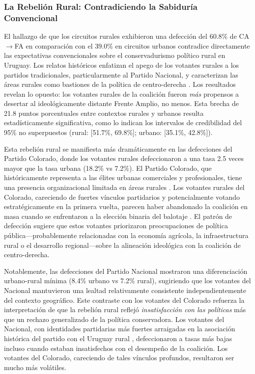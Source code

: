 \subsubsection{La Rebelión Rural: Contradiciendo la Sabiduría Convencional}

El hallazgo de que los circuitos rurales exhibieron una defección del 60.8\% de CA$\to$FA en comparación con el 39.0\% en circuitos urbanos contradice directamente las expectativas convencionales sobre el conservadurismo político rural en Uruguay. Los relatos históricos enfatizan el apego de los votantes rurales a los partidos tradicionales, particularmente al Partido Nacional, y caracterizan las áreas rurales como bastiones de la política de centro-derecha \citep{gonzalez1991electoral}. Los resultados revelan lo opuesto: los votantes rurales de la coalición fueron \textit{más} propensos a desertar al ideológicamente distante Frente Amplio, no menos. Esta brecha de 21.8 puntos porcentuales entre contextos rurales y urbanos resulta estadísticamente significativa, como lo indican los intervalos de credibilidad del 95\% no superpuestos (rural: [51.7\%, 69.8\%]; urbano: [35.1\%, 42.8\%]).

Esta rebelión rural se manifiesta más dramáticamente en las defecciones del Partido Colorado, donde los votantes rurales defeccionaron a una tasa 2.5 veces mayor que la tasa urbana (18.2\% vs 7.2\%). El Partido Colorado, que históricamente representa a las élites urbanas comerciales y profesionales, tiene una presencia organizacional limitada en áreas rurales \citep{buquet2015uruguayan, chasquetti2004democracia}. Los votantes rurales del Colorado, careciendo de fuertes vínculos partidarios y potencialmente votando estratégicamente en la primera vuelta, parecen haber abandonado la coalición en masa cuando se enfrentaron a la elección binaria del balotaje \citep{birch2003tworound}. El patrón de defección sugiere que estos votantes priorizaron preocupaciones de política pública---probablemente relacionadas con la economía agrícola, la infraestructura rural o el desarrollo regional---sobre la alineación ideológica con la coalición de centro-derecha.

Notablemente, las defecciones del Partido Nacional mostraron una diferenciación urbano-rural mínima (8.4\% urbano vs 7.2\% rural), sugiriendo que los votantes del Nacional mantuvieron una lealtad relativamente consistente independientemente del contexto geográfico. Este contraste con los votantes del Colorado refuerza la interpretación de que la rebelión rural reflejó \textit{insatisfacción con las políticas} más que un rechazo generalizado de la política conservadora. Los votantes del Nacional, con identidades partidarias más fuertes arraigadas en la asociación histórica del partido con el Uruguay rural \citep{gonzalez1993structuring}, defeccionaron a tasas más bajas incluso cuando estaban insatisfechos con el desempeño de la coalición. Los votantes del Colorado, careciendo de tales vínculos profundos, resultaron ser mucho más volátiles.

